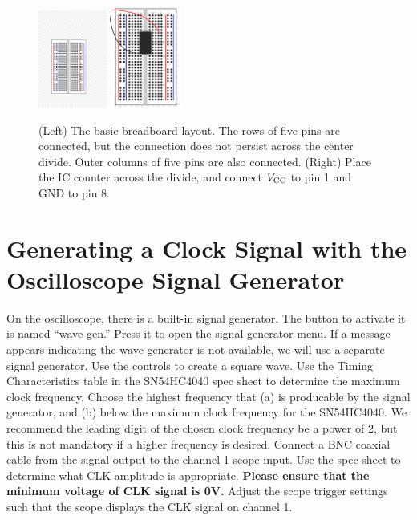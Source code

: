 \documentclass{article}
\begin{document}
\begin{figure}
\centering
\includegraphics[width=0.20\textwidth,trim=5cm 6cm 9cm 13cm,clip=true]{breadboard.jpg} \hspace{0.5cm}
\includegraphics[width=0.21\textwidth]{breadboard_power.pdf}
\caption{\label{fig:count2} (Left) The basic breadboard layout.  The rows of five pins are connected, but the connection does not persist across the center divide.  Outer columns of five pins are also connected. (Right) Place the IC counter across the divide, and connect $V_{\rm CC}$ to pin 1 and GND to pin 8.}
\end{figure}

\section{Generating a Clock Signal with the Oscilloscope Signal Generator}

On the oscilloscope, there is a built-in signal generator.  The button to activate it is named ``wave gen.''  Press it to open the signal generator menu.  If a message appears indicating the wave generator is not available, we will use a separate signal generator.  Use the controls to create a square wave.  Use the Timing Characteristics table in the SN54HC4040 spec sheet to determine the maximum clock frequency.  Choose the highest frequency that (a) is producable by the signal generator, and (b) below the maximum clock frequency for the SN54HC4040.  We recommend the leading digit of the chosen clock frequency be a power of 2, but this is not mandatory if a higher frequency is desired.  Connect a BNC coaxial cable from the signal output to the channel 1 scope input.  Use the spec sheet to determine what CLK amplitude is appropriate.  \textbf{Please ensure that the minimum voltage of CLK signal is 0V.}  Adjust the scope trigger settings such that the scope displays the CLK signal on channel 1.
\end{document}
